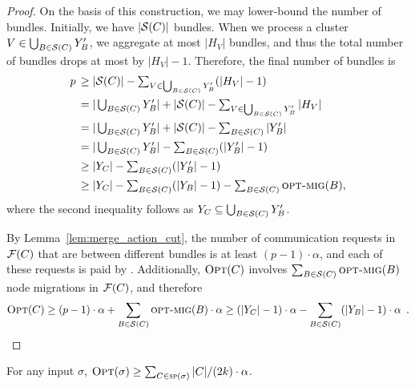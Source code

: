 \begin{proof}
On the basis of this construction, we may lower-bound the number of 
bundles. Initially, we have $|\mathcal{S}(C)|$ bundles. When we process a cluster $V \in 
\bigcup_{B \in \mathcal{S}(C)} Y'_B$, we aggregate at most $|H_V|$ bundles, and thus
the total number of bundles drops at most by $|H_V|-1$. Therefore, the final number of bundles 
is 
\begin{align*}
	p \,
	\geq &\; \textstyle |\mathcal{S}(C)| - \sum_{V \in \bigcup_{B \in \mathcal{S}(C)} Y'_B} (|H_V|-1) \\
	= &\; \textstyle |\bigcup_{B \in \mathcal{S}(C)} Y'_B| + \textstyle |\mathcal{S}(C)| - \sum_{V \in \bigcup_{B \in \mathcal{S}(C)} Y'_B} |H_V| \\
	= &\; \textstyle |\bigcup_{B \in \mathcal{S}(C)} Y'_B| + \textstyle |\mathcal{S}(C)| - \sum_{B \in \mathcal{S}(C)} |Y'_B| \\
	= &\; \textstyle |\bigcup_{B \in \mathcal{S}(C)} Y'_B| - \sum_{B \in \mathcal{S}(C)} (|Y'_B| - 1) \\
	\geq &\; \textstyle |Y_C| - \sum_{B \in \mathcal{S}(C)} (|Y'_B| - 1) \\
	\geq &\; \textstyle |Y_C| - \sum_{B \in \mathcal{S}(C)} (|Y_B|-1) - \sum_{B \in \mathcal{S}(C)} \textsc{opt-mig}(B),
\end{align*}
where the second inequality follows as $Y_C \subseteq \bigcup_{B \in \mathcal{S}(C)} Y'_B$.

By Lemma~\ref{lem:merge_action_cut}, the number of communication requests in
$\mathcal{F}(C)$ that are between different bundles is at least $(p-1) \cdot \alpha$,
and each of these requests is paid by \OPT.
Additionally, $\textsc{Opt}(C)$ involves $\sum_{B \in \mathcal{S}(C)}
\textsc{opt-mig}(B)$ node migrations in $\mathcal{F}(C)$, and therefore
\[
\textsc{Opt}(C) \geq (p-1) \cdot
\alpha + \sum_{B \in \mathcal{S}(C)} \textsc{opt-mig}(B) \cdot \alpha
\geq (|Y_C|-1) \cdot \alpha - \sum_{B \in \mathcal{S}(C)} (|Y_B|-1) \cdot \alpha\enspace.
\]
\end{proof}



\begin{lemma}
\label{lem:opt_lower_bound}
For any input $\sigma$, $\textsc{Opt}(\sigma) \geq \sum_{C \in \textsc{sp}(\sigma)}
|C| / (2k) \cdot \alpha$.
\end{lemma}

